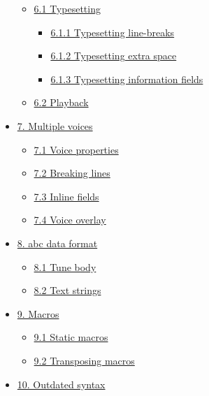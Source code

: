 \documentclass[oneside]{book}
\begin{document}
\begin{itemize}
  \begin{itemize}
  \item
    \protect\hyperlink{typesetting}{6.1 Typesetting}

    \begin{itemize}
    \item
      \protect\hyperlink{typesetting_line-breaks}{6.1.1 Typesetting
      line-breaks}
    \item
      \protect\hyperlink{typesetting_extra_space}{6.1.2 Typesetting
      extra space}
    \item
      \protect\hyperlink{typesetting_information_fields}{6.1.3
      Typesetting information fields}
    \end{itemize}
  \item
    \protect\hyperlink{playback}{6.2 Playback}
  \end{itemize}
\item
  \protect\hyperlink{multiple_voices}{7. Multiple voices}

  \begin{itemize}
  \item
    \protect\hyperlink{voice_properties}{7.1 Voice properties}
  \item
    \protect\hyperlink{breaking_lines}{7.2 Breaking lines}
  \item
    \protect\hyperlink{inline_fields}{7.3 Inline fields}
  \item
    \protect\hyperlink{voice_overlay}{7.4 Voice overlay}
  \end{itemize}
\item
  \protect\hyperlink{abc_data_format}{8. abc data format}

  \begin{itemize}
  \item
    \protect\hyperlink{tune_body}{8.1 Tune body}
  \item
    \protect\hyperlink{text_strings}{8.2 Text strings}
  \end{itemize}
\item
  \protect\hyperlink{macros}{9. Macros}

  \begin{itemize}
  \item
    \protect\hyperlink{static_macros}{9.1 Static macros}
  \item
    \protect\hyperlink{transposing_macros}{9.2 Transposing macros}
  \end{itemize}
\item
  \protect\hyperlink{outdated_syntax}{10. Outdated syntax}


\end{itemize}
\end{document}
